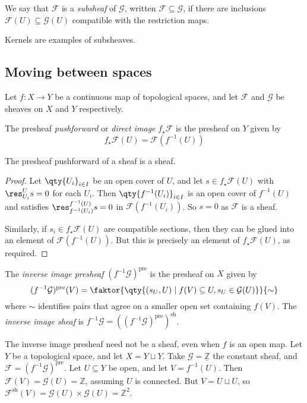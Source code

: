 \begin{definition}
    We say that \( \mathcal F \) is a \emph{subsheaf} of \( \mathcal G \), written \( \mathcal F \subseteq \mathcal G \), if there are inclusions \( \mathcal F(U) \subseteq \mathcal G(U) \) compatible with the restriction maps.
\end{definition}
Kernels are examples of subsheaves.

\subsection{Moving between spaces}
Let \( f : X \to Y \) be a continuous map of topological spaces, and let \( \mathcal F \) and \( \mathcal G \) be sheaves on \( X \) and \( Y \) respectively.
\begin{definition}
    The presheaf \emph{pushforward} or \emph{direct image} \( f_\star \mathcal F \) is the presheaf on \( Y \) given by
    \[ f_\star\mathcal F(U) = \mathcal F(f^{-1}(U)) \]
\end{definition}
\begin{proposition}
    The presheaf pushforward of a sheaf is a sheaf.
\end{proposition}
\begin{proof}
    Let \( \qty{U_i}_{i \in I} \) be an open cover of \( U \), and let \( s \in f_\star \mathcal F(U) \) with \( \res^U_{U_i} s = 0 \) for each \( U_i \).
    Then \( \qty{f^{-1}(U_i)}_{i \in I} \) is an open cover of \( f^{-1}(U) \) and satisfies \( \res^{f^{-1}(U)}_{f^{-1}(U_i)} s = 0 \) in \( \mathcal F(f^{-1}(U_i)) \).
    So \( s = 0 \) as \( \mathcal F \) is a sheaf.

    Similarly, if \( s_i \in f_\star \mathcal F(U) \) are compatible sections, then they can be glued into an element of \( \mathcal F(f^{-1}(U)) \).
    But this is precisely an element of \( f_\star \mathcal F(U) \), as required.
\end{proof}
\begin{definition}
    The \emph{inverse image presheaf} \( (f^{-1} \mathcal G)^{\mathrm{pre}} \) is the presheaf on \( X \) given by
    \[ (f^{-1}\mathcal G)^{\mathrm{pre}}(V) = \faktor{\qty{(s_U, U) \mid f(V) \subseteq U, s_U \in \mathcal G(U)}}{\sim} \]
    where \( \sim \) identifies pairs that agree on a smaller open set containing \( f(V) \).
    The \emph{inverse image sheaf} is \( f^{-1} \mathcal G = ((f^{-1} \mathcal G)^{\mathrm{pre}})^{\mathrm{sh}} \).
\end{definition}
\begin{example}
    The inverse image presheaf need not be a sheaf, even when \( f \) is an open map.
    Let \( Y \) be a topological space, and let \( X = Y \sqcup Y \).
    Take \( \mathcal G = \underline{\mathbb Z} \) the constant sheaf, and \( \mathcal F = (f^{-1} \mathcal G)^{\mathrm{pre}} \).
    Let \( U \subseteq Y \) be open, and let \( V = f^{-1}(U) \).
    Then \( \mathcal F(V) = \mathcal G(U) = \mathbb Z \), assuming \( U \) is connected.
    But \( V = U \sqcup U \), so \( \mathcal F^{\mathrm{sh}}(V) = \mathcal G(U) \times \mathcal G(U) = \mathbb Z^2 \).
\end{example}
